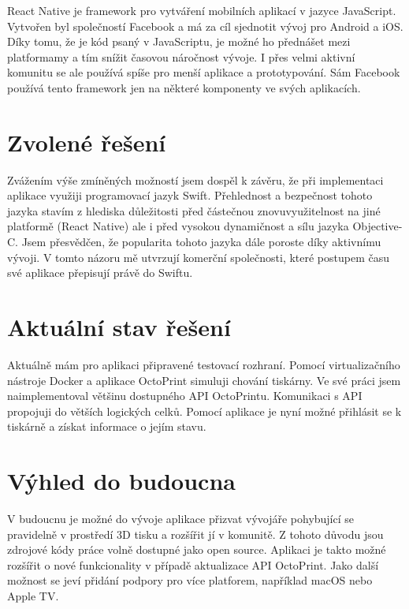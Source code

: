 \documentclass[czech]{article}
\begin{document}
React Native je framework pro vytváření mobilních aplikací v jazyce JavaScript. Vytvořen byl společností Facebook a má za cíl sjednotit vývoj pro Android a iOS. Díky tomu, že je kód psaný v JavaScriptu, je možné ho přednášet mezi platformamy a tím snížit časovou náročnost vývoje. I přes velmi aktivní komunitu se ale používá spíše pro menší aplikace a prototypování. Sám Facebook používá tento framework jen na některé komponenty ve svých aplikacích.

\section{Zvolené řešení}

Zvážením výše zmíněných možností jsem dospěl k závěru, že při implementaci aplikace využiji programovací jazyk Swift. Přehlednost a bezpečnost tohoto jazyka stavím z hlediska důležitosti před částečnou znovuvyužitelnost na jiné platformě (React Native) ale i před vysokou dynamičnost a sílu jazyka Objective-C. Jsem přesvědčen, že popularita tohoto jazyka dále poroste díky aktivnímu vývoji. V tomto názoru mě utvrzují komerční společnosti, které postupem času své aplikace přepisují právě do Swiftu.

\section{Aktuální stav řešení}

Aktuálně mám pro aplikaci připravené testovací rozhraní. Pomocí virtualizačního nástroje Docker a aplikace OctoPrint simuluji chování tiskárny. Ve své práci jsem naimplementoval většinu dostupného API OctoPrintu. Komunikaci s API propojuji do větších logických celků. Pomocí aplikace je nyní možné přihlásit se k tiskárně a získat informace o jejím stavu.

\section{Výhled do budoucna}

V budoucnu je možné do vývoje aplikace přizvat vývojáře pohybující se pravidelně v prostředí 3D tisku a rozšířit jí v komunitě. Z tohoto důvodu jsou zdrojové kódy práce volně dostupné jako open source. Aplikaci je takto možné rozšířit o nové funkcionality v případě aktualizace API OctoPrint. Jako další možnost se jeví přidání podpory pro více platforem, například macOS nebo Apple TV.
\end{document}
